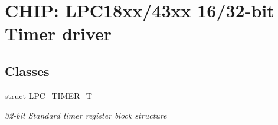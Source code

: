 \hypertarget{group___t_i_m_e_r__18_x_x__43_x_x}{}\section{C\+H\+IP\+: L\+P\+C18xx/43xx 16/32-\/bit Timer driver}
\label{group___t_i_m_e_r__18_x_x__43_x_x}
\subsection*{Classes}
\begin{DoxyCompactItemize}
\item 
struct \hyperlink{struct_l_p_c___t_i_m_e_r___t}{L\+P\+C\+\_\+\+T\+I\+M\+E\+R\+\_\+T}
\begin{DoxyCompactList}\small\item\em 32-\/bit Standard timer register block structure \end{DoxyCompactList}\end{DoxyCompactItemize}
